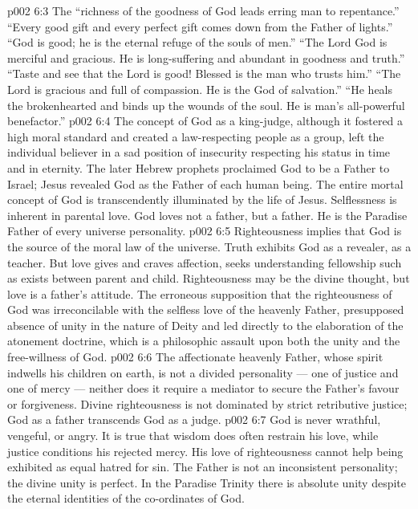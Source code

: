 \vs p002 6:3 \pc The “richness of the goodness of God leads erring man to repentance.” “Every good gift and every perfect gift comes down from the Father of lights.” “God is good; he is the eternal refuge of the souls of men.” “The Lord God is merciful and gracious. He is long\hyp{}suffering and abundant in goodness and truth.” “Taste and see that the Lord is good! Blessed is the man who trusts him.” “The Lord is gracious and full of compassion. He is the God of salvation.” “He heals the brokenhearted and binds up the wounds of the soul. He is man’s all\hyp{}powerful benefactor.”
\vs p002 6:4 \pc The concept of God as a king\hyp{}judge, although it fostered a high moral standard and created a law\hyp{}respecting people as a group, left the individual believer in a sad position of insecurity respecting his status in time and in eternity. The later Hebrew prophets proclaimed God to be a Father to Israel; Jesus revealed God as the Father of each human being. The entire mortal concept of God is transcendently illuminated by the life of Jesus. Selflessness is inherent in parental love. God loves not  a father, but  a father. He is the Paradise Father of every universe personality.
\vs p002 6:5 \pc Righteousness implies that God is the source of the moral law of the universe. Truth exhibits God as a revealer, as a teacher. But love gives and craves affection, seeks understanding fellowship such as exists between parent and child. Righteousness may be the divine thought, but love is a father’s attitude. The erroneous supposition that the righteousness of God was irreconcilable with the selfless love of the heavenly Father, presupposed absence of unity in the nature of Deity and led directly to the elaboration of the atonement doctrine, which is a philosophic assault upon both the unity and the free\hyp{}willness of God.
\vs p002 6:6 The affectionate heavenly Father, whose spirit indwells his children on earth, is not a divided personality --- one of justice and one of mercy --- neither does it require a mediator to secure the Father’s favour or forgiveness. Divine righteousness is not dominated by strict retributive justice; God as a father transcends God as a judge.
\vs p002 6:7 \pc God is never wrathful, vengeful, or angry. It is true that wisdom does often restrain his love, while justice conditions his rejected mercy. His love of righteousness cannot help being exhibited as equal hatred for sin. The Father is not an inconsistent personality; the divine unity is perfect. In the Paradise Trinity there is absolute unity despite the eternal identities of the co\hyp{}ordinates of God.
